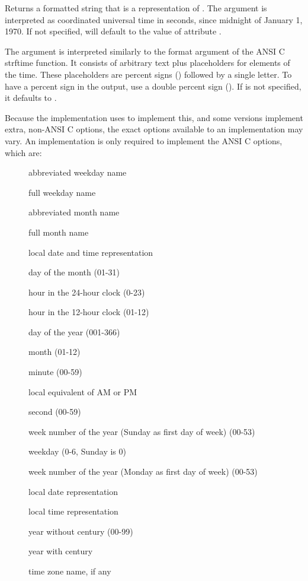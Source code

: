 \begin{description}
    Returns a formatted string that is a representation of .
    The argument  is interpreted as coordinated universal time in
    seconds, since midnight of January 1, 1970. If not specified,
     will default to the value of attribute .
		
    The argument  is interpreted similarly to the format
    argument of the ANSI C strftime function. It consists of arbitrary text
    plus placeholders for elements of the time. These placeholders are
    percent signs (\Percent) followed by a single letter.
    To have a percent sign in
    the output, use a double percent sign (\Percent\Percent).  If
     is not specified, it defaults to .

    Because the implementation uses  to implement this,
    and some
    versions implement extra, non-ANSI C options, the exact options
    available to an implementation may vary. An implementation is only
    required to implement the ANSI C options, which are: 
    \begin{description}
    \item[] abbreviated weekday name
    \item[] full weekday name
    \item[] abbreviated month name
    \item[] full month name
    \item[] local date and time representation
    \item[] day of the month (01-31)
    \item[] hour in the 24-hour clock (0-23)
    \item[] hour in the 12-hour clock (01-12)
    \item[] day of the year (001-366)
    \item[] month (01-12)
    \item[] minute (00-59)
    \item[] local equivalent of AM or PM
    \item[] second (00-59)
    \item[] week number of the year (Sunday as first day of week) (00-53)
    \item[] weekday (0-6, Sunday is 0)
    \item[] week number of the year (Monday as first day of week) (00-53)
    \item[] local date representation
    \item[] local time representation
    \item[] year without century (00-99)
    \item[] year with century
    \item[] time zone name, if any
    \end{description}


\end{description}
